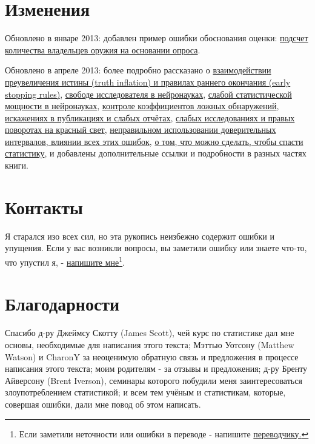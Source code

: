 \section{Изменения}
\label{chp1:changes}

Обновлено в январе 2013: добавлен пример ошибки обоснования оценки: \hyperref[chp5:arms-baserateF]{подсчет количества владельцев оружия на основании опроса}.  

Обновлено в апреле 2013: более подробно рассказано о \hyperref[chp7:truthinflation]{взаимодействии преувеличения истины (truth inflation) и правилах раннего окончания (early stopping rules)}, \hyperref[chp5:redherrings]{свободе исследователя в нейронауках}, \hyperref[chp3:powerunderpowered]{слабой статистической мощности в нейронауках}, \hyperref[chp5:controlfalserate]{контроле коэффициентов ложных обнаружений}, \hyperref[chp10]{искажениях в публикациях и слабых отчётах}, \hyperref[chp3:wrongturnred]{слабых исследованиях и правых поворотах на красный свет}, \hyperref[chp6:significantdiffmissed]{неправильном использовании доверительных интервалов},\hyperref[chp11]{
влиянии всех этих ошибок}, \hyperref[chp12]{о том, что можно сделать, чтобы спасти статистику}, и добавлены дополнительные ссылки и подробности в разных частях книги.

\section{Контакты}
\label{chp1:contact}

Я старался изо всех сил, но эта рукопись неизбежно содержит ошибки и упущения. Если у вас возникли вопросы, вы заметили ошибку или знаете что-то, что упустил я, - \href{mailto:alex@refsmmat.com}{напишите мне}\footnote{Если заметили неточности или ошибки в переводе - напишите \href{https://github.com/cellahchain/statisticsdonewrong}{переводчику.}}.

\section{Благодарности}
\label{chp1:acknow}

Спасибо д-ру Джеймсу Скотту (James Scott), чей курс по статистике дал мне основы, необходимые для написания этого текста; Мэттью Уотсону (Matthew Watson) и CharonY за неоценимую обратную связь и предложения в процессе написания этого текста; моим родителям - за отзывы и предложения; д-ру Бренту Айверсону (Brent Iverson), семинары которого побудили меня заинтересоваться злоупотреблением статистикой; и всем тем учёным и статистикам, которые, совершая ошибки, дали мне повод об этом написать.

